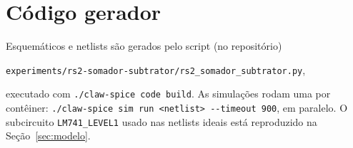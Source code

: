 \section{Código gerador}
\label{ap:codigo}

Esquemáticos e netlists são gerados pelo script (no repositório)
\begin{center}
  \texttt{experiments/rs2-somador-subtrator/rs2\_somador\_subtrator.py},
\end{center}
executado com \texttt{./claw-spice code build}. As simulações rodam
uma por contêiner: \texttt{./claw-spice sim run <netlist>
-{}-timeout 900}, em paralelo. O subcircuito \texttt{LM741\_LEVEL1}
usado nas netlists ideais está reproduzido na Seção~\ref{sec:modelo}.
